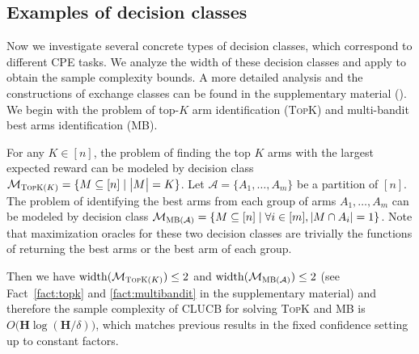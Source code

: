 \documentclass{article}
\newcommand{\wei}[1]{}
\newcommand{\wei}[1]{{\color{blue!50!black}  [\text{Wei:} #1]}}
\newcommand{\Algorithm}{{\small \textsf{CLUCB}}\xspace}
\newcommand{\Problem}{{CPE}\xspace}
\newcommand{\M}{\mathcal M}
\DeclareMathOperator{\rank}{width}
\newcommand{\MultiIdent}{\textsc{TopK}\xspace}
\newcommand{\MultiBandit}{\textsc{MB}\xspace}
\begin{document}
\subsection{Examples of decision classes}
\vspace{-0.5em}
\label{section:example}

Now we investigate several concrete types of decision classes, which correspond to different \Problem tasks.
We analyze the width of these decision classes and apply  to obtain the sample complexity bounds.
A more detailed analysis and the constructions of exchange classes can be found in the supplementary material ().
We begin with the problem of top-$K$ arm identification (\MultiIdent) and multi-bandit best arms identification (\MultiBandit).
\begin{example}[\MultiIdent and \MultiBandit]
\label{example:topk}
For any $K\in[n]$, the problem of finding the top $K$ arms with the largest expected reward can be modeled by decision class $\M_{\MultiIdent(K)}=\{M\subseteq [n] \mid \big|M\big| = K\}$.
Let $\mathcal A=\{A_1,\ldots,A_m\}$ be a partition of $[n]$. 
The problem of identifying the best arms from each group of arms $A_1,\ldots,A_m$ can be modeled by decision class
$\M_{\MultiBandit(\mathcal A)} = \{M \subseteq [n] \mid \forall i\in [m], |M\cap A_i| = 1\}$.
Note that maximization oracles for these two decision classes are trivially the functions of returning the best arms or the best arm of each group.

Then we have $\rank(\M_{\MultiIdent(K)}) \le 2$ and $\rank(\M_{\MultiBandit(\mathcal A)}) \le 2$
(see Fact~\ref{fact:topk} and \ref{fact:multibandit} in the supplementary material) and therefore the sample complexity of \Algorithm for solving \MultiIdent and \MultiBandit is $O\big(\mathbf H \log(\mathbf H/\delta)\big)$,  which matches previous results in the fixed confidence setting \citep{kalyanakrishnan2012pac,gabillon2012best,kaufmann2013information} up to constant factors.
\end{example}
\end{document}
